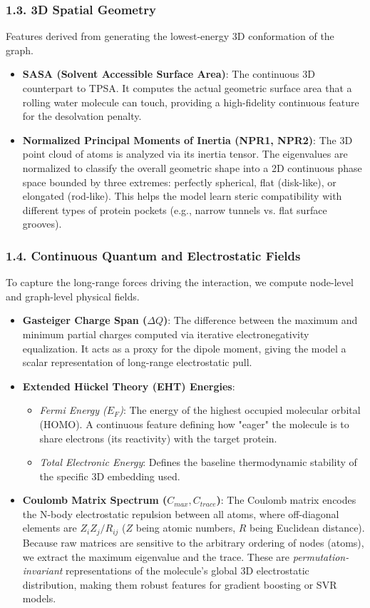 \documentclass[11pt, a4paper]{article}
\begin{document}
\subsubsection*{1.3. 3D Spatial Geometry}
Features derived from generating the lowest-energy 3D conformation of the graph.
\begin{itemize}[leftmargin=*]
    \item \textbf{SASA (Solvent Accessible Surface Area)}: The continuous 3D counterpart to TPSA. It computes the actual geometric surface area
    that a rolling water molecule can touch, providing a high-fidelity continuous feature for the desolvation penalty.
    \item \textbf{Normalized Principal Moments of Inertia (NPR1, NPR2)}: The 3D point cloud of atoms is analyzed via its inertia tensor.
    The eigenvalues are normalized to classify the overall geometric shape into a 2D continuous phase space bounded by three extremes:
    perfectly spherical, flat (disk-like), or elongated (rod-like). This helps the model learn steric compatibility with different types of
    protein pockets (e.g., narrow tunnels vs. flat surface grooves).
\end{itemize}

\subsubsection*{1.4. Continuous Quantum and Electrostatic Fields}
To capture the long-range forces driving the interaction, we compute node-level and graph-level physical fields.
\begin{itemize}[leftmargin=*]
    \item \textbf{Gasteiger Charge Span ($\Delta Q$)}: The difference between the maximum and minimum partial charges computed via iterative
    electronegativity equalization. It acts as a proxy for the dipole moment, giving the model a scalar representation of long-range electrostatic
    pull.
    \item \textbf{Extended H\"uckel Theory (EHT) Energies}:
    \begin{itemize}
        \item \textit{Fermi Energy ($E_F$)}: The energy of the highest occupied molecular orbital (HOMO). A continuous feature defining how
        "eager" the molecule is to share electrons (its reactivity) with the target protein.
        \item \textit{Total Electronic Energy}: Defines the baseline thermodynamic stability of the specific 3D embedding used.
    \end{itemize}
    \item \textbf{Coulomb Matrix Spectrum ($C_{max}, C_{trace}$)}: The Coulomb matrix encodes the N-body electrostatic repulsion between all atoms,
    where off-diagonal elements are $Z_i Z_j / R_{ij}$ ($Z$ being atomic numbers, $R$ being Euclidean distance). Because raw matrices are sensitive
    to the arbitrary ordering of nodes (atoms), we extract the maximum eigenvalue and the trace. These are \textit{permutation-invariant}
    representations of the molecule's global 3D electrostatic distribution, making them robust features for gradient boosting or SVR models.
\end{itemize}
\end{document}
